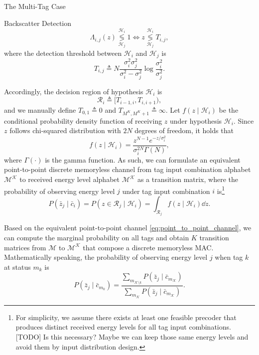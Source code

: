 \documentclass[journal]{IEEEtran}
\begin{document}
\begin{section}{The Multi-Tag Case}
\begin{subsection}{Backscatter Detection}
			\begin{equation}
				\Lambda_{i,j}(z) \underset{\mathcal{H}_j}{\overset{\mathcal{H}_i}{\lessgtr}} 1 \iff z \underset{\mathcal{H}_j}{\overset{\mathcal{H}_i}{\lessgtr}} T_{i,j},
				\label{eq:decision_rule}
			\end{equation}
			where the detection threshold between $\mathcal{H}_i$ and $\mathcal{H}_j$ is
			\begin{equation}
				T_{i,j} \triangleq N \frac{\sigma_i^2 \sigma_j^2}{\sigma_i^2 - \sigma_j^2} \log \frac{\sigma_i^2}{\sigma_j^2}.
				\label{eq:detection_threshold}
			\end{equation}

			Accordingly, the decision region of hypothesis $\mathcal{H}_i$ is
			\begin{equation}
				\mathcal{R}_i \triangleq [T_{i-1, i}, T_{i, i+1}),
				\label{eq:decision_region}
			\end{equation}
			and we manually define $T_{0,1} \triangleq 0$ and $T_{M^K,M^K+1} \triangleq \infty$. Let $f(z \mid \mathcal{H}_i)$ be the conditional probability density function of receiving $z$ under hypothesis $\mathcal{H}_i$. Since $z$ follows chi-squared distribution with $2N$ degrees of freedom, it holds that
			\begin{equation}
				f(z \mid \mathcal{H}_i) = \frac{z^{N-1} e^{-z/\sigma_i^2}}{\sigma_i^{2N} \Gamma(N)},
				\label{eq:energy_distribution}
			\end{equation}
			where $\Gamma(\cdot)$ is the gamma function. As such, we can formulate an equivalent point-to-point discrete memoryless channel from tag input combination alphabet $\mathcal{M^K}$ to received energy level alphabet $\mathcal{M^K}$ as a transition matrix, where the probability of observing energy level $j$ under tag input combination $i$ is\footnote{For simplicity, we assume there exists at least one feasible precoder that produces distinct received energy levels for all tag input combinations. [TODO] Is this necessary? Maybe we can keep those same energy levels and avoid them by input distribution design.}
			\begin{equation}
				P(\bar{z}_j \mid \bar{c}_i) = P(z \in \mathcal{R}_j \mid \mathcal{H}_i) = \int_{\mathcal{R}_j} f(z \mid \mathcal{H}_i) \dd z.
				\label{eq:point_to_point_channel}
			\end{equation}

			Based on the equivalent point-to-point channel \eqref{eq:point_to_point_channel}, we can compute the marginal probability on all tags and obtain $K$ transition matrices from $\mathcal{M}$ to $\mathcal{M^K}$ that compose a discrete memoryless MAC. Mathematically speaking, the probability of observing energy level $j$ when tag $k$ at status $m_k$ is
			\begin{equation}
				P(\bar{z}_j \mid \bar{c}_{m_k}) = \frac{\sum_{m_{\mathcal{K} \setminus k}} P(\bar{z}_j \mid \bar{c}_{m_{\mathcal{K}}})}{\sum_{m_{\mathcal{K}}} P(\bar{z}_j \mid \bar{c}_{m_{\mathcal{K}}})}.
				\label{eq:mac}
			\end{equation}


\end{subsection}
\end{section}
\end{document}
